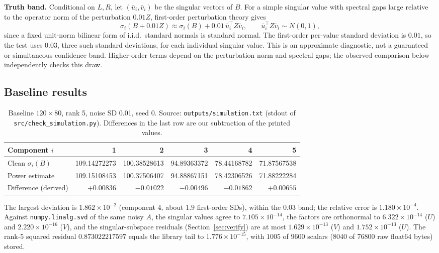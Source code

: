 \documentclass[11pt,letterpaper]{article}
\numberwithin{equation}{section}
\newcommand{\fn}[1]{\texttt{#1}}
\begin{document}
\textbf{Truth band.} Conditional on $L,R$, let $(\bar u_i,\bar v_i)$ be the singular vectors of $B$. For a simple singular value with spectral gaps large relative to the operator norm of the perturbation $0.01Z$, first-order perturbation theory gives
\begin{equation}\label{eq:firstorder}
\sigma_i(B+0.01Z)\approx\sigma_i(B)+0.01\,\bar u_i^\top Z\bar v_i,\qquad \bar u_i^\top Z\bar v_i\sim N(0,1),
\end{equation}
since a fixed unit-norm bilinear form of i.i.d.\ standard normals is standard normal. The first-order per-value standard deviation is $0.01$, so the test uses $0.03$, three such standard deviations, for each individual singular value. This is an approximate diagnostic, not a guaranteed or simultaneous confidence band. Higher-order terms depend on the perturbation norm and spectral gaps; the observed comparison below independently checks this draw.

\subsection{Baseline results}
\begin{table}[H]
\centering\footnotesize
\caption{Baseline $120\times80$, rank 5, noise SD 0.01, seed 0. Source: \texttt{outputs/simulation.txt} (stdout of \texttt{src/check\_simulation.py}). Differences in the last row are our subtraction of the printed values.}
\label{tab:baseline}
\begin{tabular}{@{}l rrrrr@{}}\toprule
Component $i$ & 1 & 2 & 3 & 4 & 5\\\midrule
Clean $\sigma_i(B)$ & 109.14272273 & 100.38528613 & 94.89363372 & 78.44168782 & 71.87567538\\
Power estimate & 109.15108453 & 100.37506407 & 94.88867151 & 78.42306526 & 71.88222284\\
Difference (derived) & $+0.00836$ & $-0.01022$ & $-0.00496$ & $-0.01862$ & $+0.00655$\\\bottomrule
\end{tabular}
\end{table}

The largest deviation is $1.862\times10^{-2}$ (component 4, about $1.9$ first-order SDs), within the $0.03$ band; the relative error is $1.180\times10^{-4}$. Against \fn{numpy.linalg.svd} of the same noisy $A$, the singular values agree to $7.105\times10^{-14}$, the factors are orthonormal to $6.322\times10^{-14}$ ($U$) and $2.220\times10^{-16}$ ($V$), and the singular-subspace residuals (Section~\ref{sec:verify}) are at most $1.629\times10^{-13}$ ($V$) and $1.752\times10^{-13}$ ($U$). The rank-5 squared residual $0.873022217597$ equals the library tail to $1.776\times10^{-15}$, with $1005$ of $9600$ scalars (8040 of 76800 raw float64 bytes) stored.
\end{document}
